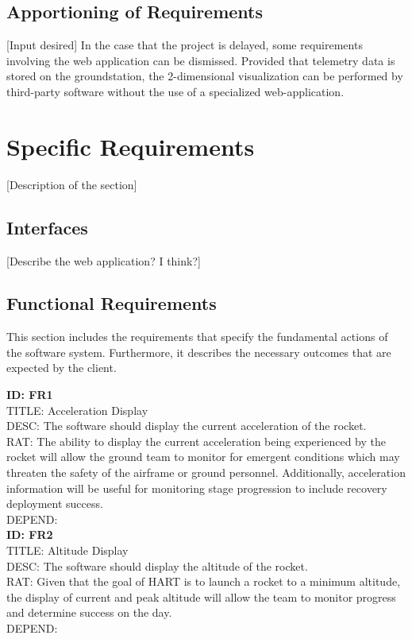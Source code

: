 \documentclass[onecolumn, draftclsnofoot,10pt, compsoc]{IEEEtran}
\begin{document}
		\subsection{Apportioning of Requirements}
			[Input desired]
			In the case that the project is delayed, some requirements involving the web application can be dismissed. Provided that telemetry data is stored on the groundstation, the 2-dimensional visualization can be performed by third-party software without the use of a specialized web-application.


	\newpage
	\section{Specific Requirements}
		[Description of the section]

		\subsection{Interfaces}
			[Describe the web application? I think?]

		\subsection{Functional Requirements}
			This section includes the requirements that specify the fundamental actions of the software system. Furthermore, it describes the necessary outcomes that are expected by the client.

			\noindent
			\textbf{ID: FR1}\\
			TITLE: Acceleration Display\\
			DESC: The software should display the current acceleration of the rocket.\\
			RAT: The ability to display the current acceleration being experienced by the rocket will allow the ground team to monitor for emergent conditions which may threaten the safety of the airframe or ground personnel.
				Additionally, acceleration information will be useful for monitoring stage progression to include recovery deployment success.\\
			DEPEND: \\
			
			\noindent
			\textbf{ID: FR2}\\
			TITLE: Altitude Display\\
			DESC: The software should display the altitude of the rocket.\\
			RAT: Given that the goal of HART is to launch a rocket to a minimum altitude, the display of current and peak altitude will allow the team to monitor progress and determine success on the day.\\
			DEPEND: \\ 
			
\end{document}
